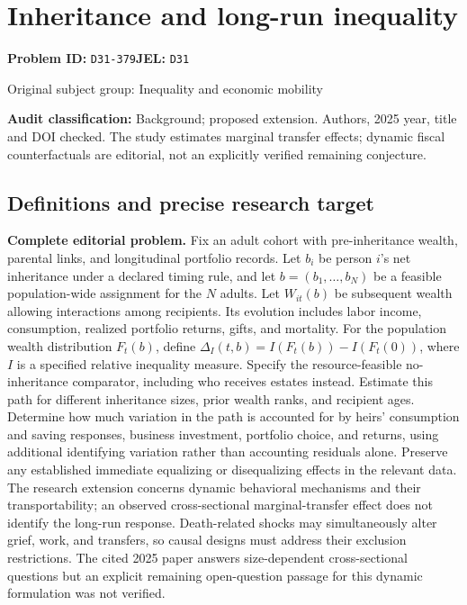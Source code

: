 \documentclass[11pt,a4paper]{article}
\begin{document}
\section*{Inheritance and long-run inequality}
\textbf{Problem ID:} \texttt{D31-379}\quad \textbf{JEL:} \texttt{D31}\par
\label{problem:OP-0369}
{\sffamily\small\color{muted}Original subject group: Inequality and economic mobility\par}
\label{definitions:problem:30007651}
\textbf{Audit classification:} Background; proposed extension. Authors, 2025 year, title and DOI checked. The study estimates marginal transfer effects; dynamic fiscal counterfactuals are editorial, not an explicitly verified remaining conjecture.
\subsection*{Definitions and precise research target}
\textbf{Complete editorial problem.} Fix an adult cohort with pre-inheritance wealth, parental links, and longitudinal portfolio records. Let \(b_i\) be person \(i\)'s net inheritance under a declared timing rule, and let \(b=(b_1,\ldots,b_N)\) be a feasible population-wide assignment for the \(N\) adults. Let \(W_{it}(b)\) be subsequent wealth allowing interactions among recipients. Its evolution includes labor income, consumption, realized portfolio returns, gifts, and mortality. For the population wealth distribution \(F_t(b)\), define \(\Delta_I(t,b)=I(F_t(b))-I(F_t(0))\), where \(I\) is a specified relative inequality measure. Specify the resource-feasible no-inheritance comparator, including who receives estates instead. Estimate this path for different inheritance sizes, prior wealth ranks, and recipient ages. Determine how much variation in the path is accounted for by heirs' consumption and saving responses, business investment, portfolio choice, and returns, using additional identifying variation rather than accounting residuals alone. Preserve any established immediate equalizing or disequalizing effects in the relevant data. The research extension concerns dynamic behavioral mechanisms and their transportability; an observed cross-sectional marginal-transfer effect does not identify the long-run response. Death-related shocks may simultaneously alter grief, work, and transfers, so causal designs must address their exclusion restrictions. The cited 2025 paper answers size-dependent cross-sectional questions but an explicit remaining open-question passage for this dynamic formulation was not verified.
\end{document}
